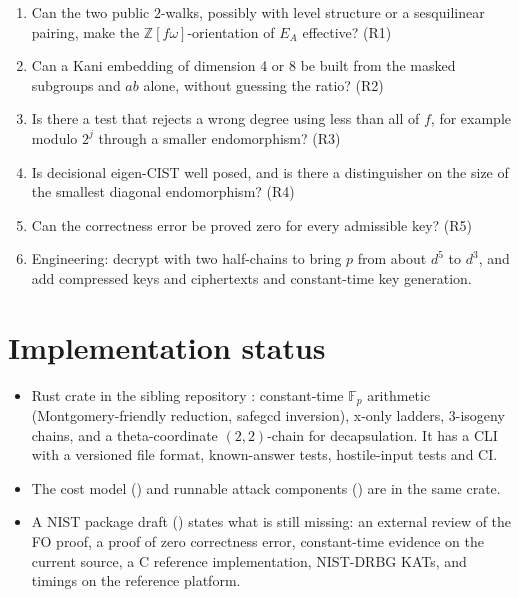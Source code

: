 \documentclass[11pt,a4paper]{article}
\newcommand{\F}{\mathbb{F}}
\newcommand{\Z}{\mathbb{Z}}
\newcommand{\EA}{E_A}
\begin{document}
\begin{enumerate}[label=\textbf{Q\arabic*.}]
\item Can the two public $2$-walks, possibly with level structure or a
  sesquilinear pairing, make the $\Z[f\omega]$-orientation of $\EA$
  effective? (R1)
\item Can a Kani embedding of dimension 4 or 8 be built from the masked
  subgroups and $ab$ alone, without guessing the ratio? (R2)
\item Is there a test that rejects a wrong degree using less than all of
  $f$, for example modulo $2^j$ through a smaller endomorphism? (R3)
\item Is decisional eigen-CIST well posed, and is there a distinguisher on
  the size of the smallest diagonal endomorphism? (R4)
\item Can the correctness error be proved zero for every admissible key?
  (R5)
\item Engineering: decrypt with two half-chains to bring $p$ from about $d^5$
  to $d^3$, and add compressed keys and ciphertexts and constant-time key
  generation.
\end{enumerate}


\section{Implementation status}\label{sec:impl}

\begin{itemize}
\item Rust crate in the sibling repository : constant-time
  $\F_p$ arithmetic (Montgomery-friendly reduction, safegcd inversion),
  x-only ladders, 3-isogeny chains, and a theta-coordinate $(2,2)$-chain
  for decapsulation. It has a CLI with a versioned file format,
  known-answer tests, hostile-input tests and CI.
\item The cost model () and runnable attack components
  () are in the same crate.
\item A NIST package draft () states what is still missing:
  an external review of the FO proof, a proof of zero correctness error,
  constant-time evidence on the current source, a C reference
  implementation, NIST-DRBG KATs, and timings on the reference platform.
\end{itemize}


\end{document}

